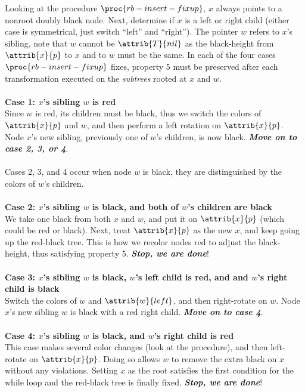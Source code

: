 \documentclass{article}
\begin{document}
\newpage
Looking at the procedure $\proc{rb-insert-fixup}$, $x$ always points to a nonroot doubly black node. Next, determine if $x$ is a left or right child (either case is symmetrical, just switch ``left'' and ``right''). The pointer $w$ refers to $x$'s sibling, note that $w$ cannot be $\attrib{T}{nil}$ as the black-height from $\attrib{x}{p}$ to $x$ and to $w$ must be the same. In each of the four cases $\proc{rb-insert-fixup}$ fixes, property 5 must be preserved after each transformation executed on the \textit{subtrees} rooted at $x$ and $w$.
\\ \\
\textbf{Case 1: $x$'s sibling $w$ is red}\\
Since $w$ is red, its children must be black, thus we switch the colors of $\attrib{x}{p}$ and $w$, and then perform a left rotation on $\attrib{x}{p}$. Node $x$'s new sibling, previously one of $w$'s children, is now black. \textbf{\emph{Move on to case 2, 3, or 4}}.
\\ \\
Cases 2, 3, and 4 occur when node $w$ is black, they are distinguished by the colors of $w$'s children.
\\ \\
\textbf{Case 2: $x$'s sibling $w$ is black, and both of $w$'s children are black}\\
We take one black from both $x$ and $w$, and put it on $\attrib{x}{p}$ (which could be red or black). Next, treat $\attrib{x}{p}$ as the new $x$, and keep going up the red-black tree. This is how we recolor nodes red to adjust the black-height, thus satisfying property 5. \textbf{\emph{Stop, we are done}}!
\\ \\
\textbf{Case 3: $x$'s sibling $w$ is black, $w$'s left child is red, and and $w$'s right child is black}\\
Switch the colors of $w$ and $\attrib{w}{left}$, and then right-rotate on $w$. Node $x$'s new sibling $w$ is black with a red right child.
\textbf{\emph{Move on to case 4}}.
\\ \\
\textbf{Case 4: $x$'s sibling $w$ is black, and $w$'s right child is red}\\
This case makes several color changes (look at the procedure), and then left-rotate on $\attrib{x}{p}$. Doing so allows $w$ to remove the extra black on $x$ without any violations. Setting $x$ as the root satisfies the first condition for the while loop and the red-black tree is finally fixed. \textbf{\emph{Stop, we are done}}!
\end{document}
